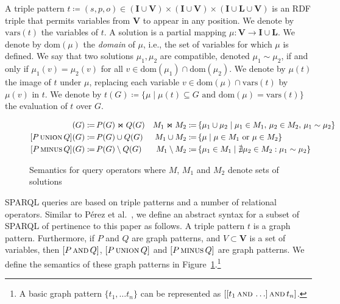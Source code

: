 \documentclass{llncs}
\newcommand{\I}{\ensuremath{\mathbf{I}}\xspace}
\renewcommand{\L}{\ensuremath{\mathbf{L}}\xspace}
\newcommand{\V}{\ensuremath{\mathbf{V}}\xspace}
\newcommand{\ssyn}[3]{[\ensuremath{#1\,\textsc{#2}\,#3}]}
\newcommand{\sand}[2]{\ssyn{#1}{and}{#2}}
\newcommand{\suni}[2]{\ssyn{#1}{union}{#2}}
\newcommand{\sminus}[2]{\ssyn{#1}{minus}{#2}}
\newcommand{\ssel}[2]{\ensuremath{\textsc{select}_{#2}#1}}
\newcommand{\dom}[1]{\ensuremath{\mathrm{dom}(#1)}}
\newcommand{\vars}[1]{\ensuremath{\mathrm{vars}(#1)}}
\newcommand{\com}[2]{\ensuremath{#1 \sim #2}}
\def\ojoin{\setbox0=\hbox{$\bowtie$}%
	\rule[0.18ex]{.25em}{.5pt}\llap{\rule[.9ex]{.25em}{.5pt}}}
\def\loj{\mathbin{\ojoin\mkern-5.8mu\bowtie}}
\newcommand{\da}{\ensuremath{:\nolinebreak\mkern-1.2mu\nolinebreak=}}
\begin{document}
A triple pattern $t \coloneqq (s,p,o) \in (\I \cup \V) \times (\I \cup \V) \times (\I \cup \L \cup \V)$ is an RDF triple that permits variables from $\V$ to appear in any position. We denote by $\vars{t}$ the variables of $t$. A solution is a partial mapping $\mu : \V \rightarrow \I \cup \L$. We denote by $\dom{\mu}$ the \textit{domain} of $\mu$, i.e., the set of variables for which $\mu$ is defined. We say that two solutions $\mu_1, \mu_2$ are compatible, denoted $\mu_1 \sim \mu_2$, if and only if $\mu_1(v) = \mu_2(v)$ for all $v \in \dom{\mu_1} \cap \dom{\mu_2}$. We denote by $\mu(t)$ the image of $t$ under $\mu$, replacing each variable $v \in \dom{\mu} \cap \vars{t}$ by $\mu(v)$ in $t$. We denote by $t(G) \coloneqq \{ \mu \mid \mu(t) \subseteq G\text{ and }\dom{\mu} = \vars{t} \}$ the evaluation of $t$ over $G$.

\begin{figure}[t]
{\footnotesize
\begin{align*}
\sand{P}{Q}(G) \da &\, P(G) \Join Q(G) & M_1 \Join M_2 \da &\, \{ \mu_1 \cup \mu_2 \mid \mu_1 \in M_1,\, \mu_2 \in M_2,\, \com{\mu_1}{\mu_2} \} \\
\suni{P}{Q}(G) \da &\, P(G) \cup Q(G) & M_1 \cup M_2 \da &\, \{ \mu \mid \mu \in M_1\text{ or }\mu \in M_2 \} \\
\sminus{P}{Q}(G) \da &\, P(G) \setminus Q(G) &  M_1 \setminus M_2 \da &\, \{ \mu_1 \in M_1 \mid \nexists \mu_2 \in M_2 : \com{\mu_1}{\mu_2} \} \\
\end{align*}}
\vspace{-1cm}
\caption{Semantics for query operators where $M$, $M_1$ and $M_2$ denote sets of solutions\label{tab:sparql}}
\end{figure}

SPARQL queries are based on triple patterns and a number of relational operators. Similar to Pérez et al.~\cite{PerezAG09}, we define an abstract syntax for a subset of SPARQL of pertinence to this paper as follows. A triple pattern $t$ is a graph pattern. Furthermore, if $P$ and $Q$ are graph patterns, and $V \subset \V$ is a set of variables, then $\sand{P}{Q}$, $\suni{P}{Q}$ and $\sminus{P}{Q}$ are graph patterns. We define the semantics of these graph patterns in Figure~\ref{tab:sparql}.\footnote{A basic graph pattern $\{ t_1, \ldots t_n\}$ can be represented as $\sand{\sand{t_1}{\ldots}}{t_n}$.}
\end{document}

